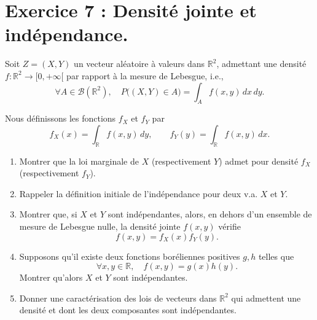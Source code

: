 \documentclass[12pt,a4paper]{article}
\begin{document}
\bigskip

\section*{Exercice 7 : Densité jointe et indépendance.}

Soit $Z = (X,Y)$ un vecteur aléatoire à valeurs dans $\mathbb{R}^2$, admettant une densité 
$f : \mathbb{R}^2 \to [0,+\infty[$ par rapport à la mesure de Lebesgue, i.e.,
\[
\forall A \in \mathcal{B}(\mathbb{R}^2), \quad 
P\big((X,Y) \in A\big) = \int_A f(x,y)\, dx\,dy.
\]

Nous définissons les fonctions $f_X$ et $f_Y$ par
\[
f_X(x) = \int_{\mathbb{R}} f(x,y)\, dy, 
\qquad 
f_Y(y) = \int_{\mathbb{R}} f(x,y)\, dx.
\]

\begin{enumerate}
    \item Montrer que la loi marginale de $X$ (respectivement $Y$) admet pour densité $f_X$ (respectivement $f_Y$).
    \item Rappeler la définition initiale de l’indépendance pour deux v.a. $X$ et $Y$.
    \item Montrer que, si $X$ et $Y$ sont indépendantes, alors, en dehors d’un ensemble de mesure de Lebesgue nulle, la densité jointe $f(x,y)$ vérifie
    \[
    f(x,y) = f_X(x) f_Y(y).
    \]
    \item Supposons qu’il existe deux fonctions boréliennes positives $g,h$ telles que
    \[
    \forall x,y \in \mathbb{R}, \quad f(x,y) = g(x)h(y).
    \]
    Montrer qu’alors $X$ et $Y$ sont indépendantes.
    \item Donner une caractérisation des lois de vecteurs dans $\mathbb{R}^2$ qui admettent une densité et dont les deux composantes sont indépendantes.
\end{enumerate}
\end{document}
